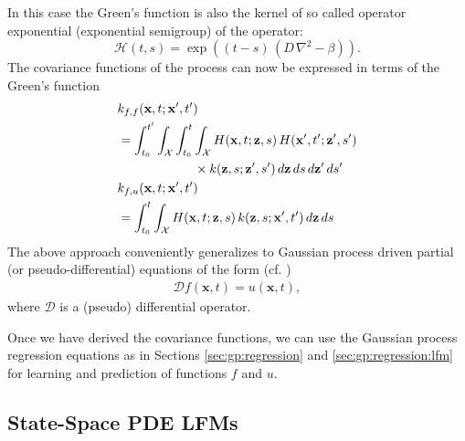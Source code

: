 \documentclass[journal]{IEEEtran}
\begin{document}
In this case the Green's function is also the kernel of so called operator exponential (exponential semigroup) of the operator:
%
\begin{equation}
  \mathcal{H}(t, s) = \exp\left( (t-s) \, (D \, \nabla^2 - \beta) \right).
\end{equation}
%
The covariance functions of the process can now be expressed in terms of the Green's function
%
\begin{equation}
\begin{split}
  &k_{f,f}(\mathbf{x}, t; \mathbf{x}', t') \\
  &=
  \int_{t_0}^{t'} \int_{\mathcal{X}} \int_{t_0}^{t}  \int_{\mathcal{X}} 
  H(\mathbf{x}, t; \mathbf{z}, s) \,
  H(\mathbf{x}', t'; \mathbf{z}', s') \\ 
   &\qquad \qquad \qquad \times
  k(\mathbf{z}, s; \mathbf{z}', s') \, d\mathbf{z} \, ds \, d\mathbf{z}' \, ds' \\
  &k_{f,u}(\mathbf{x}, t; \mathbf{x}', t') \\
  &=
  \int_{t_0}^{t}  \int_{\mathcal{X}} 
  H(\mathbf{x}, t; \mathbf{z}, s) \,
  k(\mathbf{z}, s; \mathbf{x}', t') \, d\mathbf{z} \, ds 
\end{split}
\notag
\end{equation}
%
The above approach conveniently generalizes to Gaussian process driven partial (or pseudo-differential) equations of the form (cf. \cite{Sarkka:2011})
\begin{align*}
  \mathcal{D} f(\mathbf{x},t) = u(\mathbf{x},t),
\end{align*}
%
where $\mathcal{D}$ is a (pseudo) differential operator.

Once we have derived the covariance functions, we can use the Gaussian process regression equations as in Sections \ref{sec:gp:regression} and \ref{sec:gp:regression:lfm} for learning and prediction of functions $f$ and $u$.

\subsection{State-Space PDE LFMs}
\end{document}
